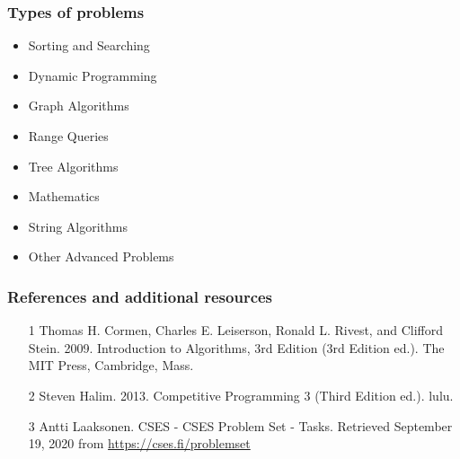 \documentclass{beamer}
\begin{document}
\begin{frame}
  \frametitle{Types of problems}
  \begin{itemize}
    \item Sorting and Searching
    \item Dynamic Programming
    \item Graph Algorithms
    \item Range Queries
    \item Tree Algorithms
    \item Mathematics
    \item String Algorithms
    \item Other Advanced Problems
  \end{itemize}
\end{frame}

\begin{frame}
  \frametitle{References and additional resources}
  \begin{itemize}
    \item [1]Thomas H. Cormen, Charles E. Leiserson, Ronald L. Rivest, and Clifford Stein. 2009. Introduction to Algorithms, 3rd Edition (3rd Edition ed.). The MIT Press, Cambridge, Mass.
    \item [2]Steven Halim. 2013. Competitive Programming 3 (Third Edition ed.). lulu.
    \item [3]Antti Laaksonen. CSES - CSES Problem Set - Tasks. Retrieved September 19, 2020 from \url{https://cses.fi/problemset}
  \end{itemize}
\end{frame}
\end{document}
